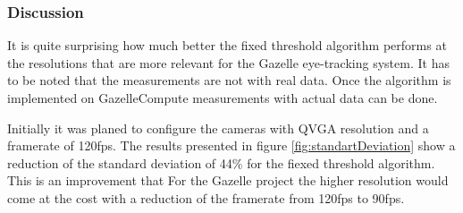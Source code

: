 \subsubsection{Discussion}
It is quite surprising how much better the fixed threshold algorithm performs at the resolutions that are more relevant for the Gazelle eye-tracking system. It has to be noted that the measurements are not with real data. Once the algorithm is implemented on GazelleCompute measurements with actual data can be done.

Initially it was planed to configure the cameras with QVGA resolution and a framerate of 120fps. The results presented in figure \ref{fig:standartDeviation} show a reduction of the standard deviation of 44\% for the fiexed threshold algorithm. This is an improvement that  For the Gazelle project the higher resolution would come at the cost with a reduction of the framerate from 120fps to 90fps. 